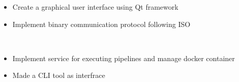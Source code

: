 \documentclass[10pt,a4paper,ragged2e,withhyper]{altacv}
\begin{document}
\begin{paracol}{2}
\begin{itemize}
\item Create a graphical user interface using Qt framework
\item Implement binary communication protocol following ISO
\end{itemize}
 \\

\divider







\begin{itemize}
\item Implement service for executing pipelines and manage docker container
\item Made a CLI tool as interfrace
\end{itemize}


\end{paracol}
\end{document}
